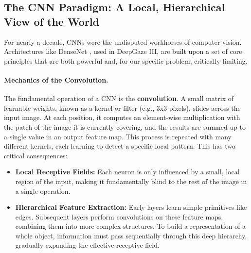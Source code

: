 \subsection{The CNN Paradigm: A Local, Hierarchical View of the World}
For nearly a decade, CNNs were the undisputed workhorses of computer vision. Architectures like DenseNet \cite{huang2017densely}, used in DeepGaze III, are built upon a set of core principles that are both powerful and, for our specific problem, critically limiting.

\paragraph{Mechanics of the Convolution.} The fundamental operation of a CNN is the \textbf{convolution}. A small matrix of learnable weights, known as a kernel or filter (e.g., 3x3 pixels), slides across the input image. At each position, it computes an element-wise multiplication with the patch of the image it is currently covering, and the results are summed up to a single value in an output feature map. This process is repeated with many different kernels, each learning to detect a specific local pattern. This has two critical consequences:
\begin{itemize}
\item \textbf{Local Receptive Fields:} Each neuron is only influenced by a small, local region of the input, making it fundamentally blind to the rest of the image in a single operation.
\item \textbf{Hierarchical Feature Extraction:} Early layers learn simple primitives like edges. Subsequent layers perform convolutions on these feature maps, combining them into more complex structures. To build a representation of a whole object, information must pass sequentially through this deep hierarchy, gradually expanding the effective receptive field.
\end{itemize}

